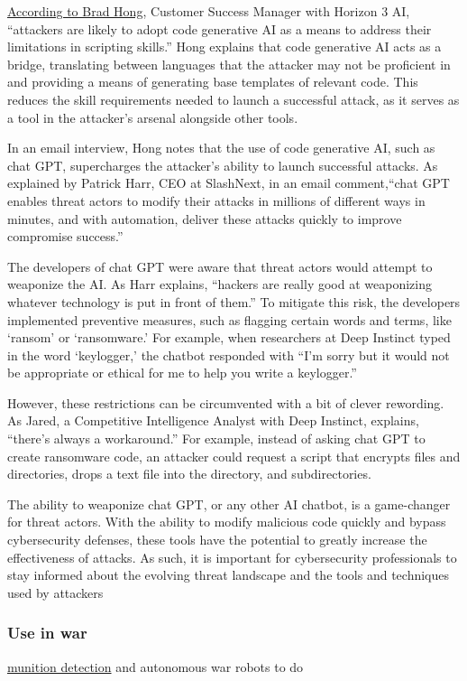 \href{https://securityintelligence.com/news/are-threat-actors-using-chatgpt-to-hack-your-network/}{According to Brad Hong}, Customer Success Manager with Horizon 3 AI, ``attackers are likely to adopt code generative AI as a means to address their limitations in scripting skills.'' Hong explains that code generative AI acts as a bridge, translating between languages that the attacker may not be proficient in and providing a means of generating base templates of relevant code. This reduces the skill requirements needed to launch a successful attack, as it serves as a tool in the attacker's arsenal alongside other tools.\par
In an email interview, Hong notes that the use of code generative AI, such as chat GPT, supercharges the attacker's ability to launch successful attacks. As explained by Patrick Harr, CEO at SlashNext, in an email comment,``chat GPT enables threat actors to modify their attacks in millions of different ways in minutes, and with automation, deliver these attacks quickly to improve compromise success.''\par
The developers of chat GPT were aware that threat actors would attempt to weaponize the AI. As Harr explains, ``hackers are really good at weaponizing whatever technology is put in front of them.'' To mitigate this risk, the developers implemented preventive measures, such as flagging certain words and terms, like `ransom' or `ransomware.' For example, when researchers at Deep Instinct typed in the word `keylogger,' the chatbot responded with ``I'm sorry but it would not be appropriate or ethical for me to help you write a keylogger.''\par
However, these restrictions can be circumvented with a bit of clever rewording. As Jared, a Competitive Intelligence Analyst with Deep Instinct, explains, ``there's always a workaround.'' For example, instead of asking chat GPT to create ransomware code, an attacker could request a script that encrypts files and directories, drops a text file into the directory, and subdirectories.\par
The ability to weaponize chat GPT, or any other AI chatbot, is a game-changer for threat actors. With the ability to modify malicious code quickly and bypass cybersecurity defenses, these tools have the potential to greatly increase the effectiveness of attacks. As such, it is important for cybersecurity professionals to stay informed about the evolving threat landscape and the tools and techniques used by attackers \cite{brundage2018malicious}
\subsubsection{Use in war}
\href{https://vframe.io/9n235/}{munition detection}  and autonomous war robots to do
